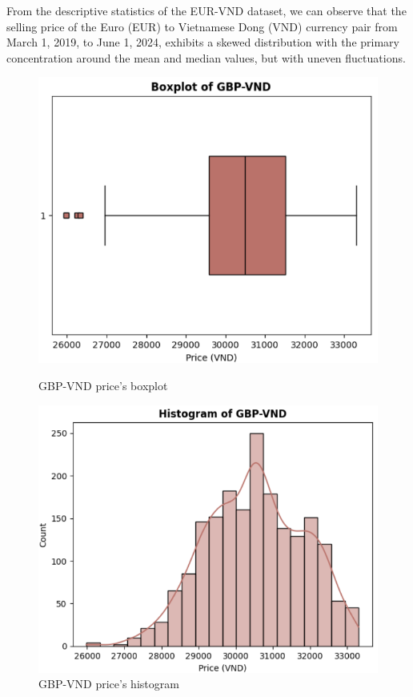 \documentclass{ieeeojies}
\begin{document}
\justify
From the descriptive statistics of the EUR-VND dataset, we can observe that the selling price of the Euro (EUR) to Vietnamese Dong (VND) currency pair from March 1, 2019, to June 1, 2024, exhibits a skewed distribution with the primary concentration around the mean and median values, but with uneven fluctuations.
\begin{figure}[H]
    \centering
    \begin{minipage}{0.23\textwidth}
    \centering
    \includegraphics[width=1\textwidth]{Descriptive_statistic/gbp_boxplot.png}
    \caption{GBP-VND price's boxplot}
    \label{fig:1}
    \end{minipage}
    \hfill
    \begin{minipage}{0.23\textwidth}
    \centering
    \includegraphics[width=1\textwidth]{Descriptive_statistic/gbp_histogram.png}
    \caption{GBP-VND price's histogram}
    \label{fig:2}
    \end{minipage}
\end{figure}
\end{document}
